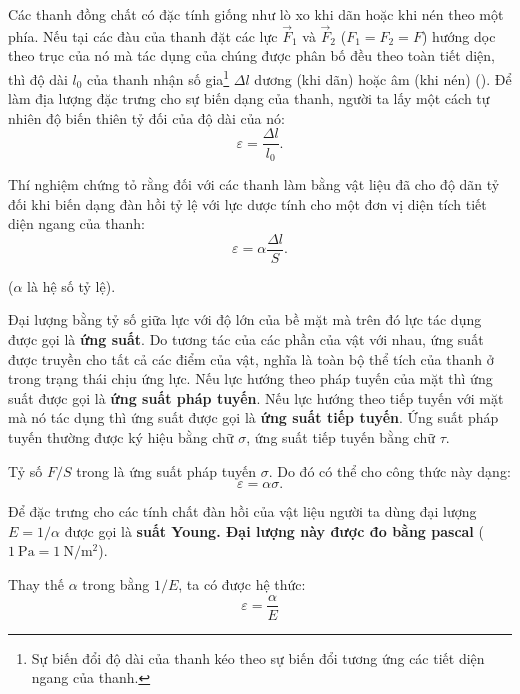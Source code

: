 Các thanh đồng chất có đặc tính giống như lò xo khi dãn hoặc khi nén theo một phía. Nếu tại các đàu của thanh đặt các lực $\vec{F}_1$ và $\vec{F}_2$ ($F_1=F_2=F$) hướng dọc theo trục của nó mà tác dụng của chúng được phân bố đều theo toàn tiết diện, thì độ dài $l_0$ của thanh nhận số gia\footnote{Sự biến đổi độ dài của thanh kéo theo sự biến đổi tương ứng các tiết diện ngang của thanh.} $\Delta l$ dương (khi dãn) hoặc âm (khi nén) (). Để làm địa lượng đặc trưng cho sự biến dạng của thanh, người ta lấy một cách tự nhiên độ biến thiên tỷ đối của độ dài của nó:
\begin{equation}\label{eq:2_27}
\varepsilon = \frac{\Delta l}{l_0}.
\end{equation}

Thí nghiệm chứng tỏ rằng đối với các thanh làm bằng vật liệu đã cho độ dãn tỷ đối khi biến dạng đàn hồi tỷ lệ với lực dược tính cho một đơn vị diện tích tiết diện ngang của thanh:
\begin{equation}\label{eq:2_28}
\varepsilon = \alpha\frac{\Delta l}{S}.
\end{equation}

\noindent
($\alpha$ là hệ số tỷ lệ).

Đại lượng bằng tỷ số giữa lực với độ lớn của bề mặt mà trên đó lực tác dụng được gọi là \textbf{ứng suất}. Do tương tác của các phần của vật với nhau, ứng suất được truyền cho tất cả các điểm của vật, nghĩa là toàn bộ thể tích của thanh ở trong trạng thái chịu ứng lực. Nếu lực hướng theo pháp tuyến của mặt thì ứng suất được gọi là \textbf{ứng suất pháp tuyến}. Nếu lực hướng theo tiếp tuyến với mặt mà nó tác dụng thì ứng suất được gọi là \textbf{ứng suất tiếp tuyến}. Ứng suất pháp tuyến thường được ký hiệu bằng chữ $\sigma$, ứng suất tiếp tuyến bằng chữ $\tau$.

Tỷ số $F/S$ trong  là ứng suất pháp tuyến $\sigma$. Do đó có thể cho công thức này dạng:
\begin{equation}\label{eq:2_29}
\varepsilon = \alpha\sigma.
\end{equation}

\noindent
Để đặc trưng cho các tính chất đàn hồi của vật liệu người ta dùng đại lượng $E=1/\alpha$ được gọi là \textbf{suất Young. Đại lượng này được đo bằng pascal} ($\SI{1}{\pascal}=\SI{1}{\newton\per\square\metre}$).

Thay thế $\alpha$ trong  bằng $1/E$, ta có được hệ thức:
\begin{equation}\label{eq:2_30}
\varepsilon = \frac{\alpha}{E}
\end{equation}

